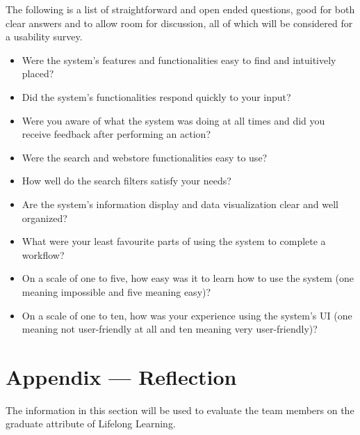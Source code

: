 \documentclass[12pt, titlepage]{article}
\begin{document}
\par{The following is a list of straightforward and open ended questions, good for both clear answers and to allow room for discussion, 
all of which will be considered for a usability survey.}

\begin{itemize}
  \item{Were the system's features and functionalities easy to find and intuitively placed?}
  \item{Did the system's functionalities respond quickly to your input?}
  \item{Were you aware of what the system was doing at all times and did you receive feedback after performing an action?}
  \item{Were the search and webstore functionalities easy to use?}
  \item{How well do the search filters satisfy your needs?}
  \item{Are the system's information display and data visualization clear and well organized?}
  \item{What were your least favourite parts of using the system to complete a workflow?}
  \item{On a scale of one to five, how easy was it to learn how to use the system (one meaning impossible and five meaning easy)?}
  \item{On a scale of one to ten, how was your experience using the system's UI (one meaning not user-friendly at all and ten meaning very 
  user-friendly)?}
\end{itemize}


\newpage{}
\section*{Appendix --- Reflection}


The information in this section will be used to evaluate the team members on the
graduate attribute of Lifelong Learning.


\end{document}
